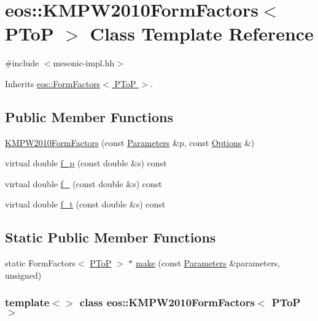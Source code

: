\hypertarget{classeos_1_1KMPW2010FormFactors_3_01PToP_01_4}{
\section{eos::KMPW2010FormFactors$<$ PToP $>$ Class Template Reference}
\label{classeos_1_1KMPW2010FormFactors_3_01PToP_01_4}
}


{\ttfamily \#include $<$mesonic-\/impl.hh$>$}

Inherits \hyperlink{classeos_1_1FormFactors_3_01PToP_01_4}{eos::FormFactors$<$ PToP $>$}.\subsection*{Public Member Functions}
\begin{DoxyCompactItemize}
\item 
\hyperlink{classeos_1_1KMPW2010FormFactors_3_01PToP_01_4_a78a3560c2eb5879191d2d65e40a0bfa7}{KMPW2010FormFactors} (const \hyperlink{classeos_1_1Parameters}{Parameters} \&p, const \hyperlink{classeos_1_1Options}{Options} \&)
\item 
virtual double \hyperlink{classeos_1_1KMPW2010FormFactors_3_01PToP_01_4_ab0d16ba2b523915c8f6169bb8783ffd0}{f\_\-p} (const double \&s) const 
\item 
virtual double \hyperlink{classeos_1_1KMPW2010FormFactors_3_01PToP_01_4_a7dc4ed06627cac344e437df9760f135f}{f\_} (const double \&s) const 
\item 
virtual double \hyperlink{classeos_1_1KMPW2010FormFactors_3_01PToP_01_4_ac679f7283ec7f07e47f31629fe412344}{f\_\-t} (const double \&s) const 
\end{DoxyCompactItemize}
\subsection*{Static Public Member Functions}
\begin{DoxyCompactItemize}
\item 
static FormFactors$<$ \hyperlink{structeos_1_1PToP}{PToP} $>$ $\ast$ \hyperlink{classeos_1_1KMPW2010FormFactors_3_01PToP_01_4_a0366ccc66d7c15c3eff6c261371d50a8}{make} (const \hyperlink{classeos_1_1Parameters}{Parameters} \&parameters, unsigned)
\end{DoxyCompactItemize}
\subsubsection*{template$<$$>$ class eos::KMPW2010FormFactors$<$ PToP $>$}



